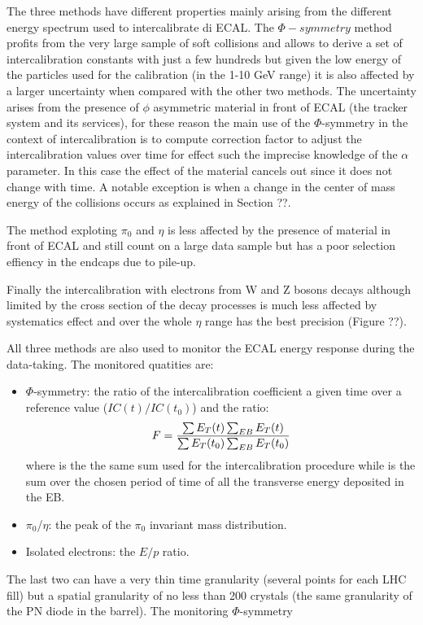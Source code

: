 The three methods have different properties mainly arising from the different energy spectrum used to intercalibrate di ECAL.
The $\Phi-symmetry$ method profits from the very large sample of soft collisions and allows to derive a set of intercalibration
constants with just a few hundreds \pbinv but given the low energy of the particles used for the calibration (in the 1-10 GeV range)
it is also affected by a larger uncertainty when compared with the other two methods.
The uncertainty arises from the presence of $\phi$ asymmetric material in front of ECAL
(the tracker system and its services), for these reason the main use of
the $\Phi$-symmetry in the context of intercalibration is to compute correction factor to adjust the intercalibration values
over time for effect such the imprecise knowledge of the $\alpha$ parameter. In this case the effect of the material cancels
out since it does not change with time. A notable exception is when a change in the center of mass energy of the collisions
occurs as explained in Section ??.

The method exploting $\pi_0$ and $\eta$ is less affected by the presence of material in front of ECAL and
still count on a large data sample but has a poor selection effiency in the endcaps due to pile-up.

Finally the intercalibration with electrons from W and Z bosons decays although limited by the cross section
of the decay processes is much less affected by systematics effect and over the whole $\eta $ range has the best
precision (Figure ??).

All three methods are also used to monitor the ECAL energy response during the data-taking. The monitored quatities are:
\begin{itemize}
\item $\Phi$-symmetry: the ratio of the intercalibration coefficient a given time over a reference value ($IC(t)/IC(t_0)$) and
  the ratio:
  \[
F = \frac{\sum E_T(t)\sum_{EB} E_T(t)}{\sum E_T(t_0)\sum_{EB} E_T(t_0)}
\]
where \sumEt is the the same sum used for the intercalibration procedure while \sumEtEB is the sum over the chosen period of time
of all the transverse energy deposited in the EB.
\item $\pi_0$/$\eta$: the peak of the $\pi_0$ invariant mass distribution.
\item Isolated electrons: the $E/p$ ratio.
\end{itemize}

The last two can have a very thin time granularity (several points for each LHC fill) but a spatial granularity of no less
than 200 crystals (the same granularity of the PN diode in the barrel). The monitoring $\Phi$-symmetry

